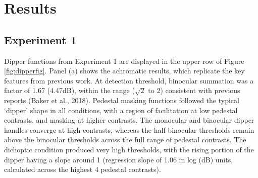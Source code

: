 \documentclass[
]{article}
\begin{document}
\hypertarget{results}{%
\section{Results}\label{results}}

\hypertarget{experiment-1}{%
\subsection{Experiment 1}\label{experiment-1}}

Dipper functions from Experiment 1 are displayed in the upper row of Figure \ref{fig:dipperfig}. Panel (a) shows the achromatic results, which replicate the key features from previous work. At detection threshold, binocular summation was a factor of 1.67 (4.47dB), within the range (\(\sqrt{2}\) to 2) consistent with previous reports (Baker et al., 2018). Pedestal masking functions followed the typical `dipper' shape in all conditions, with a region of facilitation at low pedestal contrasts, and masking at higher contrasts. The monocular and binocular dipper handles converge at high contrasts, whereas the half-binocular thresholds remain above the binocular thresholds across the full range of pedestal contrasts. The dichoptic condition produced very high thresholds, with the rising portion of the dipper having a slope around 1 (regression slope of 1.06 in log (dB) units, calculated across the highest 4 pedestal contrasts).
\end{document}
